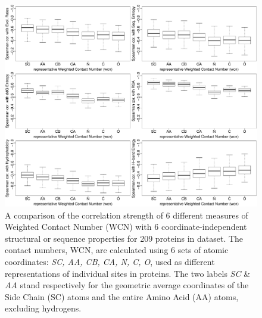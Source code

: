 \documentclass[11pt]{article}
\begin{document}
    \begin{figure}[tbh]
        \begin{center}
        \includegraphics[width=6.9in]{best_wcn/select_variables/boxplot_wcn_all_in_one.pdf}
        \end{center}
        \caption{A comparison of the correlation strength of 6 different measures of Weighted Contact Number (WCN) with 6 coordinate-independent structural or sequence properties for 209 proteins in dataset. The contact numbers, WCN, are calculated using 6 sets of atomic coordinates: {\it SC, AA, CB, CA, N, C, O}, used as different representations of individual sites in proteins. The two labels {\it SC} \& {\it AA} stand respectively for the geometric average coordinates of the Side Chain (SC) atoms and the entire Amino Acid (AA) atoms, excluding hydrogens.}
        \label{fig:best_wcn}
    \end{figure}
\end{document}
